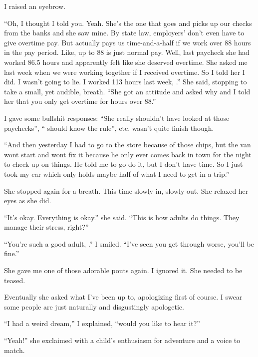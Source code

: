 I raised an eyebrow.
\VV


``Oh, I thought I told you.
Yeah. She's the one that goes and picks up our checks from the banks
and she saw mine.  By state law, employers' don't even have to
give overtime pay.  But \mike{} actually pays us time-and-a-half if
we work over 88 hours in the pay period.
Like, up to 88 is just normal pay.
Well, last paycheck she had worked 86.5 hours and apparently felt like
she deserved overtime.  She asked me last week when we were working together
if I received overtime.  So I told her I did.  I wasn't going to lie.
I worked 113 hours last week, \josh.''
She said, stopping to take a small, yet audible, breath.
``She got an attitude and asked why and I told her that you only get overtime
for hours over 88.''
\VV


\noindent
I gave some bullshit responses:
``She really shouldn't have looked at those paychecks'',
``\jasmine{} should know the rule'', etc.
\april{} wasn't quite finish though.
\VV


``And then yesterday I had to go to the store because of those chips,
but the van wont start and \mike{} wont fix it because he only
ever comes back in town for the night to check up on things.
He told me to go do it, but I don't have time.  So I just took
my car which only holds maybe half of what I need to get in a trip.''
\VV

\noindent
She stopped again for a breath.  This time slowly in, slowly out.
She relaxed her eyes as she did.
\VV


\noindent
``It's okay. Everything is okay.'' she said.  ``This is how adults do things.
They manage their stress, right?''
\VV


``You're such a good adult, \april.''  I smiled.
``I've seen you get through worse, you'll be fine.''
\VV


\noindent
She gave me one of those adorable pouts again.  I ignored it.
She needed to be teased.
\VV


\noindent
Eventually she asked what I've been up to, apologizing first of course.
I swear some people are just naturally and disgustingly apologetic.
\VV


``I had a weird dream,'' I explained, ``would you like to hear it?''
\VV


``Yeah!'' she exclaimed with a child's enthusiasm for adventure and a
voice to match.
\vspace*{3ex}


